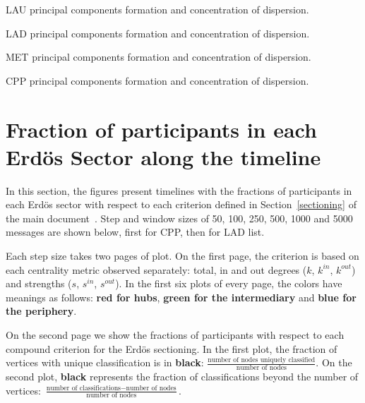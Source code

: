 \documentclass[%
 aip,
 jmp,%
 amsmath,amssymb,
 reprint,%
 floatfix,
]{revtex4-1}
\begin{document}
\begin{table}[!h]
	\caption{LAU principal components formation and concentration of dispersion.}
	\footnotesize
	
\label{tab:pcain}
\end{table}
\begin{table}[!h]
	\caption{LAD principal components formation and concentration of dispersion.}
	\footnotesize
	
\label{tab:pcain}
\end{table}
\begin{table}[!h]
	\caption{MET principal components formation and concentration of dispersion.}
	\footnotesize
	
\label{tab:pcain}
\end{table}
\begin{table}[!h]
	\caption{CPP principal components formation and concentration of dispersion.}
	\footnotesize
	
\label{tab:pcain}
\end{table}


\FloatBarrier
\section{Fraction of participants in each Erd\"os Sector along the timeline}\label{si:frac}
In this section, the figures present timelines
with the 
fractions of participants in each Erd\"os sector with respect to each criterion defined in Section~\ref*{sectioning} of the main document~\cite{tpaper}. Step and window sizes of 50, 100, 250, 500, 1000 and 5000 messages are shown below, first for CPP, then for  LAD list.

Each step size takes two pages of plot.
On the first page, the criterion is based on each centrality metric observed separately: total, in and out degrees ($k$, $k^{in}$, $k^{out}$) and strengths ($s$, $s^{in}$, $s^{out}$).
In the first six plots of every page,
the colors have meanings as follows: {\bf \color{red} red for hubs}, {\color{Green}\bf green for the intermediary} and {\bf\color{blue} blue for the periphery}.


On the second page we show the fractions of participants with respect to each compound criterion for the Erd\"os sectioning.
In the first plot, the fraction of vertices with unique classification is in {\bf black}:
$\frac{\text{number of nodes uniquely classified}}{\text{number of nodes}}$.
On the second plot, {\bf black} represents the fraction of classifications beyond the number of vertices:
$\frac{\text{number of classifications} - \text{number of nodes}}{\text{number of nodes}}$.
\end{document}
